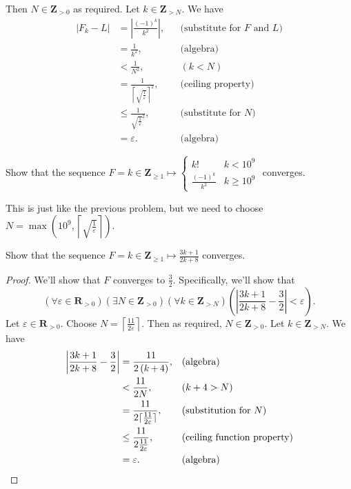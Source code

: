 \documentclass[12pt, fleqn]{exam}
\newcommand{\reals}{\mathbf{R}}
\newcommand{\integers}{\mathbf{Z}}
\begin{document}
\begin{questions}
\begin{solution}
Then $N \in \integers_{>0}$ as required.  Let $k \in \integers_{> N}$. We have
\begin{align*}
   |F_k -L | &= \left|\frac{(-1)^k}{k^2} \right|,&& \text{(substitute for $F$ and $L$)} \\
                 &= \frac{1}{k^2}, &&\text{(algebra)}\\
                 &< \frac{1}{N^2}, &&(k < N) \\
                 &=  \frac{1}{\left \lceil \sqrt{\frac{1}{\varepsilon}} \right \rceil^2}, && \text{(ceiling property)}\\
                 &\leq \frac{1}{\sqrt{\frac{1}{\varepsilon}}^2}, && \text{(substitute for $N$)}\\
                 &= \varepsilon. &&\text{(algebra)}
\end{align*}
\end{solution}
\question Show that the sequence $F = k \in \integers_{\geq 1} \mapsto \begin{cases} k! & k < 10^9 \\
\frac{(-1)^k}{k^2} & k \geq 10^9 \end{cases}$ converges.

\begin{solution} This is just like the previous problem, but we need to choose $N = \max(10^9,  \left \lceil \sqrt{\frac{1}{\varepsilon}} \right \rceil)$.

\end{solution}

\question Show that the sequence $F = k \in \integers_{\geq 1} \mapsto \frac{3 k+ 1}{2 k + 8}$ converges.

\begin{solution}
\begin{proof} We'll show that $F$ converges to $\frac{3}{2}$. Specifically,
  we'll show that 
  \begin{equation*}
    \left(\forall \varepsilon \in \reals_{> 0} \right)
    \left(\exists N \in \integers_{> 0} \right)
    \left(\forall k \in \integers_{> N} \right)
   \left( \left| \frac{ 3k+1}{2 k + 8} - \frac{3}{2} \right| < \varepsilon \right).
  \end{equation*}
Let $\varepsilon \in \reals_{> 0}$. Choose $N = \left \lceil \frac{11}{2 \varepsilon} \right \rceil$.
Then as required, $N \in \integers_{> 0}$. Let $k \in \integers_{>N}$. 
We have
\begin{align*}
 \left| \frac{ 3k+1}{2 k + 8} - \frac{3}{2} \right| &= \frac{11}{2 \left( k\operatorname{+}4\right) }, 
                &&\mbox{(\text{algebra})}\\
                &< \frac{11}{2 N}, && (k + 4 > N) \\
                &=  \frac{11}{2 \lceil \frac{11}{2 \varepsilon} \rceil}, && \mbox{(substitution for $N$)} \\
                &\leq \frac{11}{2 \frac{11}{2 \varepsilon}},  && \mbox{(ceiling function property)} \\
                &=  \varepsilon. &&\mbox{(\text{algebra})} \qedhere
\end{align*}


\end{proof}
\end{solution}
\end{questions}
\end{document}
